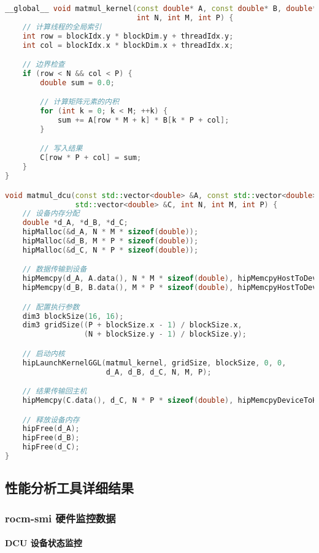 \documentclass[a4paper]{article}
\begin{document}
\begin{lstlisting}[language=C++]
__global__ void matmul_kernel(const double* A, const double* B, double* C,
                              int N, int M, int P) {
    // 计算线程的全局索引
    int row = blockIdx.y * blockDim.y + threadIdx.y;
    int col = blockIdx.x * blockDim.x + threadIdx.x;

    // 边界检查
    if (row < N && col < P) {
        double sum = 0.0;

        // 计算矩阵元素的内积
        for (int k = 0; k < M; ++k) {
            sum += A[row * M + k] * B[k * P + col];
        }

        // 写入结果
        C[row * P + col] = sum;
    }
}

void matmul_dcu(const std::vector<double> &A, const std::vector<double> &B,
                std::vector<double> &C, int N, int M, int P) {
    // 设备内存分配
    double *d_A, *d_B, *d_C;
    hipMalloc(&d_A, N * M * sizeof(double));
    hipMalloc(&d_B, M * P * sizeof(double));
    hipMalloc(&d_C, N * P * sizeof(double));

    // 数据传输到设备
    hipMemcpy(d_A, A.data(), N * M * sizeof(double), hipMemcpyHostToDevice);
    hipMemcpy(d_B, B.data(), M * P * sizeof(double), hipMemcpyHostToDevice);

    // 配置执行参数
    dim3 blockSize(16, 16);
    dim3 gridSize((P + blockSize.x - 1) / blockSize.x,
                  (N + blockSize.y - 1) / blockSize.y);

    // 启动内核
    hipLaunchKernelGGL(matmul_kernel, gridSize, blockSize, 0, 0,
                       d_A, d_B, d_C, N, M, P);

    // 结果传输回主机
    hipMemcpy(C.data(), d_C, N * P * sizeof(double), hipMemcpyDeviceToHost);

    // 释放设备内存
    hipFree(d_A);
    hipFree(d_B);
    hipFree(d_C);
}
\end{lstlisting}

\subsection{性能分析工具详细结果}

\subsubsection{rocm-smi 硬件监控数据}

\paragraph{DCU 设备状态监控}
\end{document}
